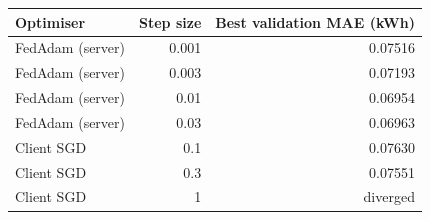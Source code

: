 \begin{tabular}{lrr}
\toprule
Optimiser & Step size & Best validation MAE (kWh) \\
\midrule
FedAdam (server) & 0.001 & 0.07516 \\
FedAdam (server) & 0.003 & 0.07193 \\
FedAdam (server) & 0.01 & 0.06954 \\
FedAdam (server) & 0.03 & 0.06963 \\
Client SGD & 0.1 & 0.07630 \\
Client SGD & 0.3 & 0.07551 \\
Client SGD & 1 & diverged \\
\bottomrule
\end{tabular}
